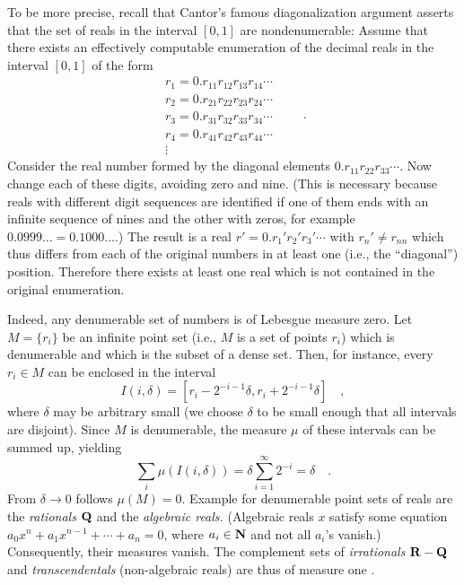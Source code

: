To be more precise, recall that
Cantor's  famous diagonalization argument \cite{cantor-set}
asserts that the set of reals in the interval $[0,1]$ are nondenumerable:
Assume that there exists an effectively
 computable
 enumeration of the decimal reals in the interval $[0,1]$ of the form
$$ \begin{array}{c}
 r_1=0.r_{11}r_{12}r_{13}r_{14} \cdots \\
 r_2=0.r_{21}r_{22}r_{23}r_{24} \cdots \\
 r_3=0.r_{31}r_{32}r_{33}r_{34} \cdots \\
 r_4=0.r_{41}r_{42}r_{43}r_{44} \cdots \\
 \vdots
 \end{array}\qquad .$$
 Consider the real number formed by the diagonal elements
 $0.r_{11}r_{22}r_{33}\cdots $.
 Now change each of these digits, avoiding zero and nine.
 (This is necessary because reals with different
 digit sequences are identified if one of them ends with an
 infinite sequence of nines and the other with zeros, for example
 $0.0999\ldots =0.1000\ldots $.)
 The result is a real
  $r'=0.r_{1}'r_{2}'r_{3}'\cdots $
  with $r_n'\neq  r_{nn}$
 which thus differs from each of the original numbers in at least
 one (i.e., the ``diagonal'') position.
 Therefore there exists at least one real which is not contained in the
 original enumeration.

Indeed, any denumerable set of numbers is of Lebesgue measure zero.
 Let $M=\{ r_i\}$ be an  infinite point set (i.e., $M$ is a
 set of
 points $r_i$) which is denumerable and which is the subset of a dense
 set. Then, for instance, every $r_i\in M$ can be enclosed in the
 interval $$
 I(i,\delta)= [r_i-2^{-i-1}\delta
 ,
 r_i+2^{-i-1}\delta]\quad ,
 $$
 where $\delta $ may be arbitrary small (we choose $\delta$ to be
 small enough that all intervals are disjoint).
 Since $M$ is denumerable, the measure $\mu$ of these intervals can
 be summed up, yielding
$$
 \sum_i \mu( I(i,\delta))= \delta \sum_{i=1}^\infty 2^{-i}=\delta \quad
 . $$
 From $\delta \rightarrow 0$ follows $\mu (M)=0$.
 Example for denumerable point sets of reals are the {\em rationals}
${\Bbb Q}$ and
 the {\em algebraic reals.} (Algebraic reals $x$  satisfy some
 equation $ a_0x^n +a_1x^{n-1}+ \cdots  +a_n=0$,
 where $a_i\in {\Bbb N} $ and not all $a_i$'s vanish.) Consequently,
their
 measures vanish. The complement
 sets
 of {\em irrationals} ${\Bbb R} - {\Bbb Q}$ and {\em transcendentals}
 (non-algebraic reals) are thus of measure one \cite{hardy-54}.

